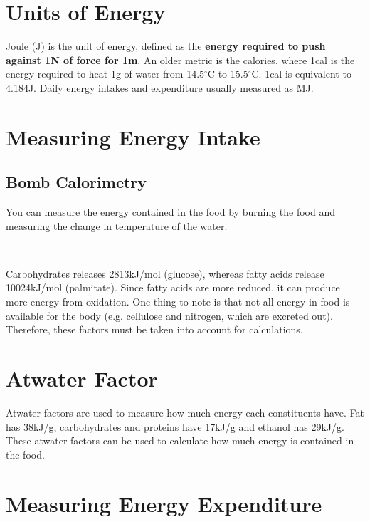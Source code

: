 \section{Units of Energy}

Joule (J) is the unit of energy, defined as the \textbf{energy required to push against 1N of force for 1m}.
An older metric is the calories, where 1cal is the energy required to heat 1g of water from 14.5$^\circ$C to 15.5$^\circ$C.
1cal is equivalent to 4.184J.
Daily energy intakes and expenditure usually measured as MJ.

\section{Measuring Energy Intake}

\subsection{Bomb Calorimetry}

You can measure the energy contained in the food by burning the food and measuring the change in temperature of the water.

\begin{center}
\\
\end{center}

Carbohydrates releases 2813kJ/mol (glucose), whereas fatty acids release 10024kJ/mol (palmitate).
Since fatty acids are more reduced, it can produce more energy from oxidation.
One thing to note is that not all energy in food is available for the body (e.g. cellulose and nitrogen, which are excreted out).
Therefore, these factors must be taken into account for calculations.

\section{Atwater Factor}

Atwater factors are used to measure how much energy each constituents have.
Fat has 38kJ/g, carbohydrates and proteins have 17kJ/g and ethanol has 29kJ/g.
These atwater factors can be used to calculate how much energy is contained in the food.

\section{Measuring Energy Expenditure}

